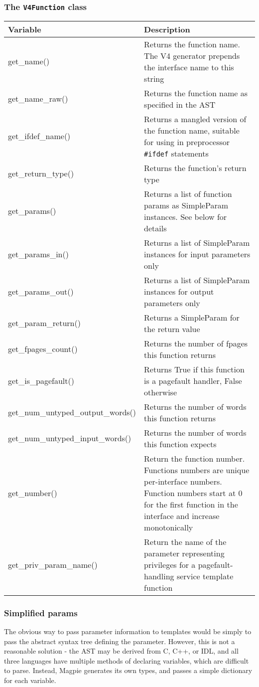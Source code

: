\subsubsection{The {\tt V4Function} class}
\begin{tabularx}{\textwidth}{lX}
\textbf{Variable}&\textbf{Description}\\
\hline
get\_name()&Returns the function name. The V4 generator prepends the interface name to this string\\
get\_name\_raw()&Returns the function name as specified in the AST\\
get\_ifdef\_name()&Returns a mangled version of the function name, suitable for using in preprocessor {\tt \#ifdef} statements\\
get\_return\_type()&Returns the function's return type\\
get\_params()&Returns a list of function params as SimpleParam instances. See below for details\\
get\_params\_in()&Returns a list of SimpleParam instances for input parameters only\\
get\_params\_out()&Returns a list of SimpleParam instances for output parameters only\\
get\_param\_return()&Returns a SimpleParam for the return value\\
get\_fpages\_count()&Returns the number of fpages this function returns\\
get\_is\_pagefault()&Returns True if this function is a pagefault handler, False otherwise\\
get\_num\_untyped\_output\_words()&Returns the number of words this function returns\\
get\_num\_untyped\_input\_words()&Returns the number of words this function expects\\
get\_number()&Return the function number. Functions numbers are unique per-interface numbers. Function numbers start at 0 for the first function in the interface and increase monotonically\\
get\_priv\_param\_name()&Return the name of the parameter representing privileges for a pagefault-handling service template function
\end{tabularx}

\subsubsection{Simplified params}
The obvious way to pass parameter information to templates would be simply to pass the abstract syntax tree defining the parameter. However, this is not a reasonable solution - the AST may be derived from C, C++, or IDL, and all three languages have multiple methods of declaring variables, which are difficult to parse. Instead, Magpie generates its own types, and passes a simple dictionary for each variable. 


